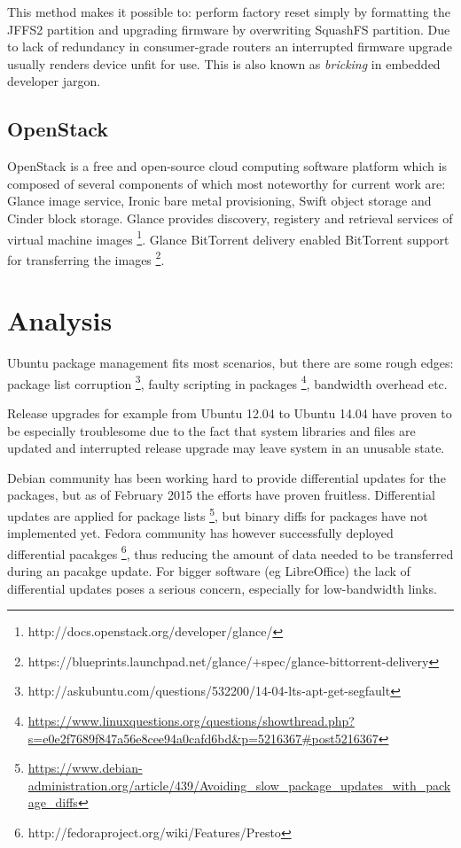 \documentclass{article}
\begin{document}
This method makes it possible to: perform factory reset simply by formatting
the JFFS2 partition and upgrading firmware by overwriting SquashFS partition.
Due to lack of redundancy in consumer-grade routers an interrupted firmware
upgrade usually renders device unfit for use. This is also known as
\emph{bricking} in embedded developer jargon.


\subsection{OpenStack}

OpenStack is a free and open-source cloud computing software platform
which is composed of several components of which most noteworthy for current work are:
Glance image service, Ironic bare metal provisioning,
Swift object storage and Cinder block storage.
Glance provides discovery, registery and retrieval services of virtual machine images
\footnote{http://docs.openstack.org/developer/glance/}.
Glance BitTorrent delivery enabled BitTorrent support for transferring the images
\footnote{https://blueprints.launchpad.net/glance/+spec/glance-bittorrent-delivery}.


\section{Analysis}

Ubuntu package management fits most scenarios, but there are some rough edges:
package list corruption
\footnote{http://askubuntu.com/questions/532200/14-04-lts-apt-get-segfault},
faulty scripting in packages
\footnote{\url{https://www.linuxquestions.org/questions/showthread.php?s=e0e2f7689f847a56e8cee94a0cafd6bd&p=5216367#post5216367}},
bandwidth overhead etc.

Release upgrades for example from Ubuntu 12.04 to Ubuntu 14.04
have proven to be especially troublesome due to the fact that system libraries
and files are updated and interrupted release upgrade may leave system
in an unusable state.

Debian community has been working hard to provide differential updates for
the packages, but as of February 2015 the efforts have proven fruitless.
Differential updates are applied for package lists
\footnote{\url{https://www.debian-administration.org/article/439/Avoiding_slow_package_updates_with_package_diffs}},
but binary diffs for packages have not implemented yet.
Fedora community has however successfully deployed differential pacakges
\footnote{http://fedoraproject.org/wiki/Features/Presto},
thus reducing the amount of data needed to be transferred during an pacakge update. For bigger software (eg LibreOffice) the lack of differential updates poses a serious concern, especially for low-bandwidth links.
\end{document}
